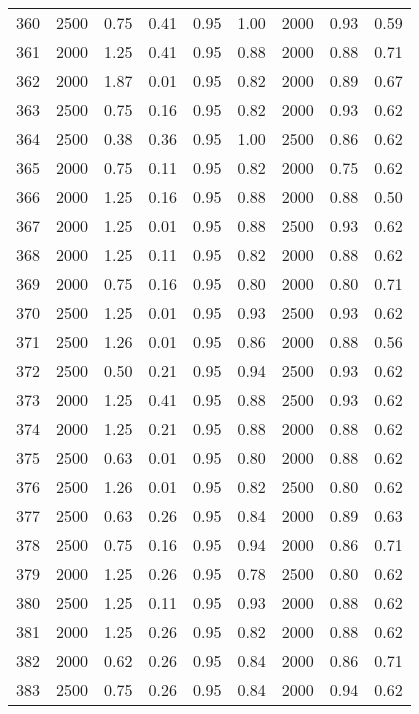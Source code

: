\begin{longtable}[c]{ccccccccc}
360 &  2500 &  0.75 &  0.41 &  0.95 &  1.00 &  2000 &  0.93 &  0.59 \\
361 &  2000 &  1.25 &  0.41 &  0.95 &  0.88 &  2000 &  0.88 &  0.71 \\
362 &  2000 &  1.87 &  0.01 &  0.95 &  0.82 &  2000 &  0.89 &  0.67 \\
363 &  2500 &  0.75 &  0.16 &  0.95 &  0.82 &  2000 &  0.93 &  0.62 \\
364 &  2500 &  0.38 &  0.36 &  0.95 &  1.00 &  2500 &  0.86 &  0.62 \\
365 &  2000 &  0.75 &  0.11 &  0.95 &  0.82 &  2000 &  0.75 &  0.62 \\
366 &  2000 &  1.25 &  0.16 &  0.95 &  0.88 &  2000 &  0.88 &  0.50 \\
367 &  2000 &  1.25 &  0.01 &  0.95 &  0.88 &  2500 &  0.93 &  0.62 \\
368 &  2000 &  1.25 &  0.11 &  0.95 &  0.82 &  2000 &  0.88 &  0.62 \\
369 &  2000 &  0.75 &  0.16 &  0.95 &  0.80 &  2000 &  0.80 &  0.71 \\
370 &  2500 &  1.25 &  0.01 &  0.95 &  0.93 &  2500 &  0.93 &  0.62 \\
371 &  2500 &  1.26 &  0.01 &  0.95 &  0.86 &  2000 &  0.88 &  0.56 \\
372 &  2500 &  0.50 &  0.21 &  0.95 &  0.94 &  2500 &  0.93 &  0.62 \\
373 &  2000 &  1.25 &  0.41 &  0.95 &  0.88 &  2500 &  0.93 &  0.62 \\
374 &  2000 &  1.25 &  0.21 &  0.95 &  0.88 &  2000 &  0.88 &  0.62 \\
375 &  2500 &  0.63 &  0.01 &  0.95 &  0.80 &  2000 &  0.88 &  0.62 \\
376 &  2500 &  1.26 &  0.01 &  0.95 &  0.82 &  2500 &  0.80 &  0.62 \\
377 &  2500 &  0.63 &  0.26 &  0.95 &  0.84 &  2000 &  0.89 &  0.63 \\
378 &  2500 &  0.75 &  0.16 &  0.95 &  0.94 &  2000 &  0.86 &  0.71 \\
379 &  2000 &  1.25 &  0.26 &  0.95 &  0.78 &  2500 &  0.80 &  0.62 \\
380 &  2500 &  1.25 &  0.11 &  0.95 &  0.93 &  2000 &  0.88 &  0.62 \\
381 &  2000 &  1.25 &  0.26 &  0.95 &  0.82 &  2000 &  0.88 &  0.62 \\
382 &  2000 &  0.62 &  0.26 &  0.95 &  0.84 &  2000 &  0.86 &  0.71 \\
383 &  2500 &  0.75 &  0.26 &  0.95 &  0.84 &  2000 &  0.94 &  0.62 \\

\end{longtable}
